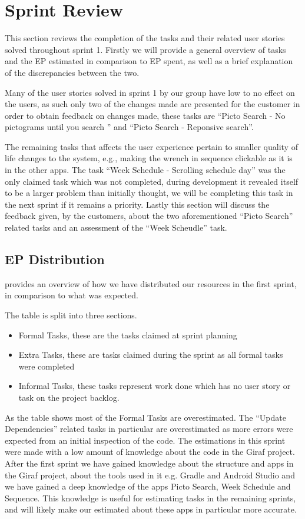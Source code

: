 \section{Sprint Review}\label{s1rev}
This section reviews the completion of the tasks and their related user stories solved throughout sprint 1.
Firstly we will provide a general overview of tasks and the EP estimated in comparison to EP spent, as well as a brief explanation of the discrepancies between the two.

Many of the user stories solved in sprint 1 by our group have low to no effect on the users, as such only two of the changes made are presented for the customer in order to obtain feedback on changes made, these tasks are ``Picto Search - No pictograms until you search '' and ``Picto Search - Reponsive search''.

The remaining tasks that affects the user experience pertain to smaller quality of life changes to the system, e.g., making the wrench in sequence clickable as it is in the other apps. 
The task ``Week Schedule - Scrolling schedule day'' was the only claimed task which was not completed, during development it revealed itself to be a larger problem than initially thought, we will be completing this task in the next sprint if it remains a \phigh priority.
Lastly this section will discuss the feedback given, by the customers, about the two aforementioned ``Picto Search'' related tasks and an assessment of the ``Week Scheudle'' task.

\subsection{EP Distribution}
 provides an overview of how we have distributed our resources in the first sprint, in comparison to what was expected.

The table is split into three sections.
\begin{itemize}
    \item Formal Tasks, these are the tasks claimed at sprint planning
    \item Extra Tasks, these are tasks claimed during the sprint as all formal tasks were completed
    \item Informal Tasks, these tasks represent work done which has no user story or task on the project backlog.
\end{itemize}
As the table shows most of the Formal Tasks are overestimated.
The ``Update Dependencies'' related tasks in particular are overestimated as more errors were expected from an initial inspection of the code.
The estimations in this sprint were made with a low amount of knowledge about the code in the Giraf project.
After the first sprint we have gained knowledge about the structure and apps in the Giraf project, about the tools used in it e.g. Gradle and Android Studio and we have gained a deep knowledge of the apps Picto Search, Week Schedule and Sequence.
This knowledge is useful for estimating tasks in the remaining sprints, and will likely make our estimated about these apps in particular more accurate.

